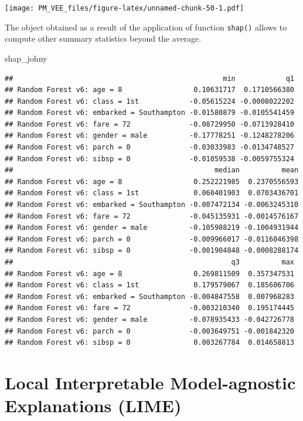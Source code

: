 \documentclass[12pt,]{krantz}
\newenvironment{Shaded}{\begin{snugshade}}{\end{snugshade}}
\newcommand{\NormalTok}[1]{#1}
\begin{document}
\texttt{[image: PM\_VEE\_files/figure-latex/unnamed-chunk-50-1.pdf]}

The object obtained as a result of the application of function \texttt{shap()} allows to compute other summary statistics beyond the average.

\begin{Shaded}
\begin{Highlighting}[]
\NormalTok{shap_johny}
\end{Highlighting}
\end{Shaded}

\begin{verbatim}
##                                                  min            q1
## Random Forest v6: age = 8                 0.10631717  0.1710566380
## Random Forest v6: class = 1st            -0.05615224 -0.0008022202
## Random Forest v6: embarked = Southampton -0.01580879 -0.0105541459
## Random Forest v6: fare = 72              -0.08729950 -0.0713928410
## Random Forest v6: gender = male          -0.17778251 -0.1248278206
## Random Forest v6: parch = 0              -0.03033983 -0.0134748527
## Random Forest v6: sibsp = 0              -0.01059538 -0.0059755324
##                                                median          mean
## Random Forest v6: age = 8                 0.252221985  0.2370556593
## Random Forest v6: class = 1st             0.060401903  0.0703436701
## Random Forest v6: embarked = Southampton -0.007472134 -0.0063245310
## Random Forest v6: fare = 72              -0.045135931 -0.0014576167
## Random Forest v6: gender = male          -0.105988219 -0.1004931944
## Random Forest v6: parch = 0              -0.009966017 -0.0116046398
## Random Forest v6: sibsp = 0              -0.001904848 -0.0008288174
##                                                    q3          max
## Random Forest v6: age = 8                 0.269811509  0.357347531
## Random Forest v6: class = 1st             0.179579067  0.185606706
## Random Forest v6: embarked = Southampton -0.004847558  0.007968283
## Random Forest v6: fare = 72              -0.003210340  0.195174445
## Random Forest v6: gender = male          -0.078935433 -0.042726778
## Random Forest v6: parch = 0              -0.003649751 -0.001842320
## Random Forest v6: sibsp = 0               0.003267784  0.014658813
\end{verbatim}

\hypertarget{LIME}{%
\section{Local Interpretable Model-agnostic Explanations (LIME)}\label{LIME}}
\end{document}
